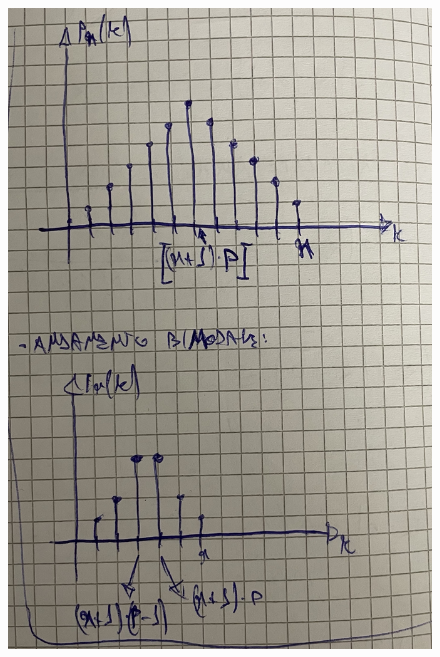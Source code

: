 \documentclass{article}
\begin{document}
\begin{figure}[ht]
\centering
\includegraphics[scale=0.12]{images/25.ProvRip.jpeg}
\end{figure}
\end{document}

